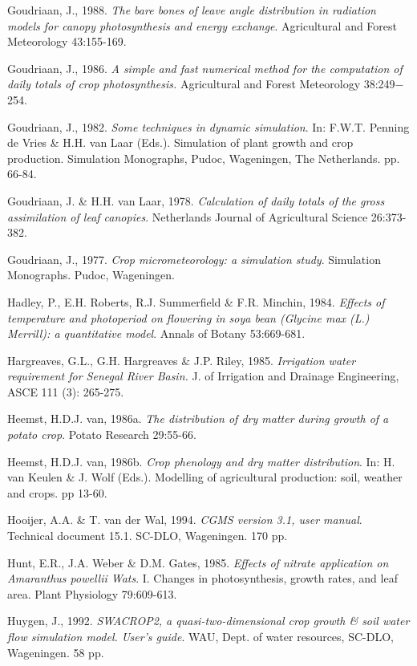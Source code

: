 Goudriaan, J., 1988. {\it The bare bones of leave angle distribution in radiation models for
canopy photosynthesis and energy exchange\/}. Agricultural and Forest Meteorology 43:155-169.

Goudriaan, J., 1986. {\it A simple and fast numerical method for the computation of daily totals
of crop photosynthesis.\/} Agricultural and Forest Meteorology 38:249$-$254. 

Goudriaan, J., 1982. {\it Some techniques in dynamic simulation\/}. In:  F.W.T. Penning de Vries
\& H.H. van Laar (Eds.). Simulation of plant growth and crop production. Simulation
Monographs, Pudoc, Wageningen, The Netherlands. pp. 66-84.

Goudriaan, J. \& H.H. van Laar, 1978. {\it Calculation of daily totals of the gross assimilation
of leaf canopies\/}. Netherlands Journal of Agricultural Science 26:373-382.

Goudriaan, J., 1977. {\it Crop micrometeorology: a simulation study\/}. Simulation Monographs.
Pudoc, Wageningen.

Hadley, P., E.H. Roberts, R.J. Summerfield \& F.R. Minchin, 1984. {\it Effects of temperature
and photoperiod on flowering in soya bean (Glycine max (L.) Merrill): a quantitative model\/}.
Annals of Botany 53:669-681.

Hargreaves, G.L., G.H. Hargreaves \& J.P. Riley, 1985. {\it Irrigation water requirement for
Senegal River Basin.\/} J. of Irrigation and Drainage Engineer\-ing, ASCE 111 (3): 265-275.

Heemst, H.D.J. van, 1986a. {\it The distribution of dry matter during growth of a potato crop\/}. Potato
Research 29:55-66. 

Heemst, H.D.J. van, 1986b. {\it Crop phenology and dry matter distribution\/}. In:  H. van Keulen \& J.
Wolf (Eds.). Modelling of agricultural production: soil, weather and crops. pp 13-60.

Hooijer, A.A. \& T. van der Wal, 1994. {\it CGMS version 3.1, user manual\/}. Technical document 15.1.
SC-DLO, Wageningen. 170 pp.

Hunt, E.R., J.A. Weber \& D.M. Gates, 1985. {\it Effects of nitrate application on Amaranthus powellii
Wats\/}. I. Changes in photosynthesis, growth rates, and leaf area. Plant Physiology 79:609-613.

Huygen, J., 1992. {\it SWACROP2, a quasi-two-dimensional crop growth \& soil water flow simulation
model. User's guide\/}. WAU, Dept. of water resources, SC-DLO, Wageningen. 58 pp.


